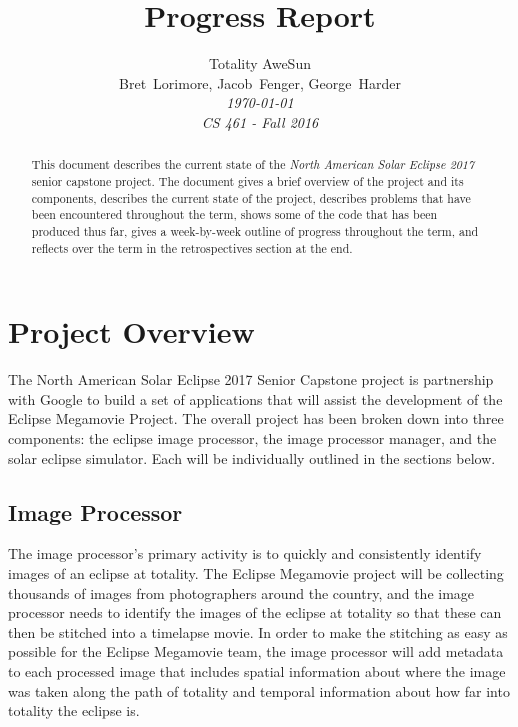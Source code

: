 \documentclass[10pt, onecolumn, draftclsnofoot, letterpaper, compsoc]{IEEEtran}
\title{Progress Report}
\author{Totality AweSun \\
		Bret~Lorimore, Jacob~Fenger, George~Harder \\
		\textit{\today \\
		CS 461 - Fall 2016}}
\begin{document}
\maketitle

\begin{abstract}
This document describes the current state of the \textit{North American Solar Eclipse 2017}
senior capstone project. The document gives a brief overview of the project and its components,
describes the current state of the project, describes problems that have been
encountered throughout the term, shows some of the code that has been produced thus far, gives
a week-by-week outline of progress throughout the term, and reflects over the term in the
retrospectives section at the end.
\end{abstract}

\newpage

\tableofcontents

\newpage

\section{Project Overview}

The North American Solar Eclipse 2017 Senior Capstone project is partnership
with Google to build a set of applications that will assist the development of
the Eclipse Megamovie Project. The overall project has been broken down into
three components: the eclipse image processor, the image processor manager, and
the solar eclipse simulator. Each will be individually outlined in the sections
below.

\subsection{Image Processor}

The image processor’s primary activity is to quickly and consistently identify
images of an eclipse at totality. The Eclipse Megamovie project will be
collecting thousands of images from photographers around the country, and the
image processor needs to identify the images of the eclipse at totality so that
these can then be stitched into a timelapse movie. In order to make the
stitching as easy as possible for the Eclipse Megamovie team, the image
processor will add metadata to each processed image that includes spatial
information about where the image was taken along the path of totality and
temporal information about how far into totality the eclipse is.
\end{document}
